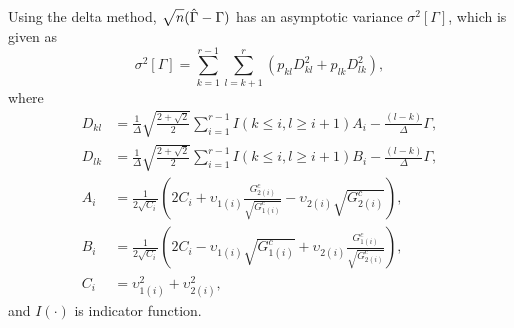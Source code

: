\documentclass[a4j,12pt]{article}
\begin{document}
Using the delta method, $~\sqrt[]{\mathstrut n}(\hat{\Gamma}  - \Gamma)$ has an asymptotic variance $\sigma^2[ \Gamma ]$, which is given as 
\[
\sigma^2[ \Gamma ]  = \sum^{r-1}_{k=1} \sum^{r}_{l=k+1}  \left( p_{kl} D^2_{kl} + p_{lk} D^2_{lk} \right),
\]
where
\begin{equation}
\begin{split}
D_{kl} &= \frac{1}{\Delta} \sqrt{ \frac{2+\sqrt{2}}{2} } \sum^{r-1}_{i=1} I(k \leq i, l \geq i+1) A_i - \frac{(l-k)}{\Delta} \Gamma, \\
D_{lk} &= \frac{1}{\Delta} \sqrt{ \frac{2+\sqrt{2}}{2} } \sum^{r-1}_{i=1} I(k \leq i, l \geq i+1) B_i - \frac{(l-k)}{\Delta} \Gamma, \\
A_i &= \frac{1}{2\sqrt{C_i}} \left(  2C_i + \upsilon_{1(i)} \frac{G^c_{2(i)}}{\sqrt{G^c_{1(i)}}} - \upsilon_{2(i)} \sqrt{G^c_{2(i)}} \right), \\
B_i &= \frac{1}{2\sqrt{C_i}} \left(  2C_i - \upsilon_{1(i)} \sqrt{G^c_{1(i)}} + \upsilon_{2(i)} \frac{G^c_{1(i)}}{\sqrt{G^c_{2(i)}}} \right), \\
C_i &= \upsilon_{1(i)}^2 + \upsilon_{2(i)}^2, \nonumber
\end{split}
\end{equation}
and $I(\cdot)$ is indicator function.
\end{document}
